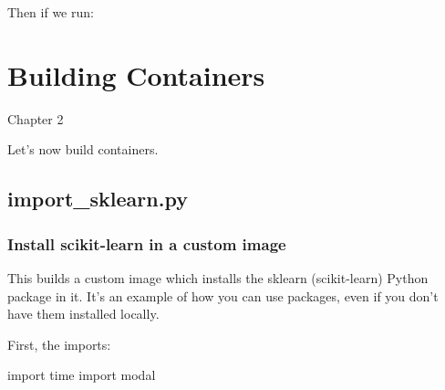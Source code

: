 \documentclass[
  letterpaper,
  DIV=11,
  numbers=noendperiod]{scrreprt}
\newenvironment{Shaded}{\begin{snugshade}}{\end{snugshade}}
\newcommand{\AttributeTok}[1]{\textcolor[rgb]{0.40,0.45,0.13}{#1}}
\newcommand{\ExtensionTok}[1]{\textcolor[rgb]{0.00,0.23,0.31}{#1}}
\newcommand{\ImportTok}[1]{\textcolor[rgb]{0.00,0.46,0.62}{#1}}
\newcommand{\NormalTok}[1]{\textcolor[rgb]{0.00,0.23,0.31}{#1}}
\begin{document}
Then if we run:

\begin{Shaded}
\end{Shaded}


\hypertarget{building-containers}{%
\chapter{Building Containers}\label{building-containers}}

Chapter 2

\hfill\break

Let's now build containers.

\hypertarget{import_sklearn.py}{%
\section{import\_sklearn.py}\label{import_sklearn.py}}

\hypertarget{install-scikit-learn-in-a-custom-image}{%
\subsection{Install scikit-learn in a custom
image}\label{install-scikit-learn-in-a-custom-image}}

This builds a custom image which installs the sklearn (scikit-learn)
Python package in it. It's an example of how you can use packages, even
if you don't have them installed locally.

First, the imports:

\begin{Shaded}
\begin{Highlighting}[]
\ImportTok{import}\NormalTok{ time}
\ImportTok{import}\NormalTok{ modal}
\end{Highlighting}
\end{Shaded}
\end{document}
